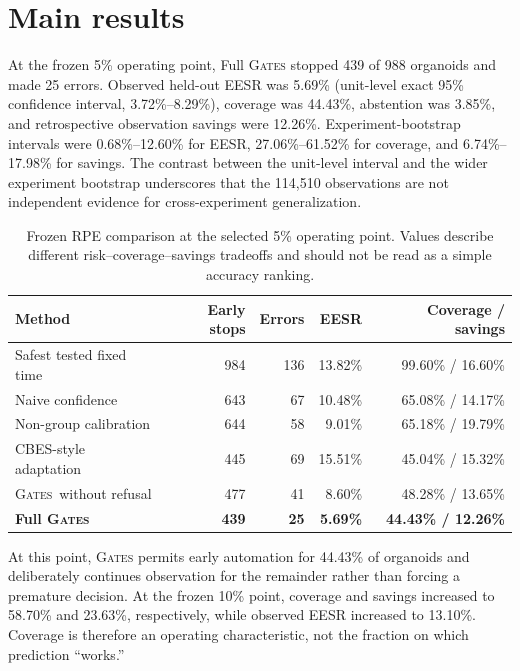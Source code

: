 \documentclass[11pt,twocolumn]{article}
\newcommand{\method}{\textsc{Gates}\xspace}
\newcommand{\pct}[1]{#1\%}
\begin{document}
\section{Main results}

At the frozen 5\% operating point, Full \method stopped 439 of 988 organoids and made 25 errors.
Observed held-out EESR was \pct{5.69} (unit-level exact 95\% confidence interval,
\pct{3.72}--\pct{8.29}), coverage was \pct{44.43}, abstention was \pct{3.85}, and retrospective
observation savings were \pct{12.26}. Experiment-bootstrap intervals were
\pct{0.68}--\pct{12.60} for EESR, \pct{27.06}--\pct{61.52} for coverage, and
\pct{6.74}--\pct{17.98} for savings. The contrast between the unit-level interval and the wider
experiment bootstrap underscores that the 114,510 observations are not independent evidence for
cross-experiment generalization.

\begin{table}[t]
\centering
\caption{Frozen RPE comparison at the selected 5\% operating point. Values describe different
risk--coverage--savings tradeoffs and should not be read as a simple accuracy ranking.}
\label{tab:main}
\small
\begin{tabular}{@{}lrrrr@{}}
\toprule
Method & Early stops & Errors & EESR & Coverage / savings \\
\midrule
Safest tested fixed time & 984 & 136 & 13.82\% & 99.60\% / 16.60\% \\
Naive confidence & 643 & 67 & 10.48\% & 65.08\% / 14.17\% \\
Non-group calibration & 644 & 58 & 9.01\% & 65.18\% / 19.79\% \\
CBES-style adaptation & 445 & 69 & 15.51\% & 45.04\% / 15.32\% \\
\method\ without refusal & 477 & 41 & 8.60\% & 48.28\% / 13.65\% \\
\textbf{Full \method} & \textbf{439} & \textbf{25} & \textbf{5.69\%} & \textbf{44.43\% / 12.26\%} \\
\bottomrule
\end{tabular}
\end{table}

At this point, \method permits early automation for \pct{44.43} of organoids and deliberately
continues observation for the remainder rather than forcing a premature decision. At the frozen
10\% point, coverage and savings increased to \pct{58.70} and \pct{23.63}, respectively, while
observed EESR increased to \pct{13.10}. Coverage is therefore an operating characteristic, not the
fraction on which prediction ``works.''
\end{document}
